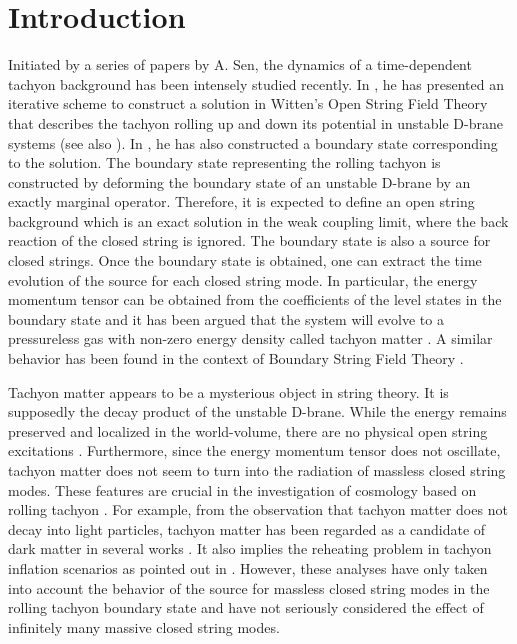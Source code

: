 \documentclass[a4paper,12pt]{article} \textheight=8.5truein
\begin{document}
\section{Introduction}
\setcounter{equation}{0} Initiated by a series of papers
\cite{Sen:2002nu,Sen:2002in,Sen:2002an} by A. Sen, the dynamics of
a time-dependent tachyon background has been intensely studied
recently. In \cite{Sen:2002nu}, he has presented an iterative
scheme to construct a solution in Witten's Open String Field
Theory that describes the tachyon rolling up and down its
potential in unstable D-brane systems (see also
\cite{Sen:2002vv,Moeller:2002vx,Kluson:2002te}). In
\cite{Sen:2002nu,Sen:2002in,Sen:2002vv}, he has also constructed a
boundary state corresponding to the solution. The boundary state
representing the rolling tachyon is constructed by deforming the
boundary state of an unstable D-brane by an exactly marginal
operator. Therefore, it is expected to define an open string
background which is an exact solution in the weak coupling limit,
where the back reaction of the closed string is ignored. The
boundary state is also a source for closed strings. Once the
boundary state is obtained, one can extract the time evolution of
the source for each closed string mode. In particular, the energy
momentum tensor can be obtained from the coefficients of the level
\coordHE{} states in the boundary state and it has been argued that
the system will evolve to a pressureless gas with non-zero energy
density called tachyon matter \cite{Sen:2002in}. A similar
behavior has been found in the context of Boundary String Field
Theory \cite{Sugimoto:2002fp,Minahan:2002if}.


Tachyon matter appears to be a mysterious object in string theory.
It is supposedly the decay product of the unstable D-brane. While
the energy remains preserved and localized in the world-volume,
there are no physical open string excitations
\cite{Sen:2002an,Ishida:2002fr}. Furthermore, since the energy
momentum tensor does not oscillate, tachyon matter does not seem
to turn into the radiation of massless closed string modes. These
features are crucial in the investigation of cosmology based on
rolling tachyon \cite{cosmology,dark matter,inflation}. For example,
from the observation that tachyon matter does not decay into light
particles, tachyon matter has been regarded as a candidate of dark
matter in several works \cite{Sen:2002in,dark matter}. It also implies the
reheating problem in tachyon inflation scenarios \cite{inflation}
as pointed out in \cite{reheating}. However, these analyses have
only taken into account the behavior of the source for massless
closed string modes in the rolling tachyon boundary state and have
not seriously considered the effect of infinitely many massive closed string modes.
\end{document}

